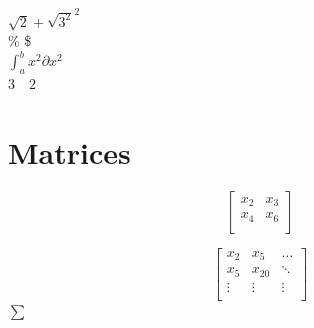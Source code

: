 \documentclass{article}
\begin{document}
$\sqrt{2} + \sqrt{3^2}^2$\\

\%  \$	\\
$\int_{a}^{b} x^2 \partial 
x^2$\\

$3\quad 2$ 

\section*{Matrices}

\[  
\begin{bmatrix}
	x_{2} & x_{3}\\
	x_{4} & x_{6}\\
\end{bmatrix}
	\]

\[	
	\begin{bmatrix}
	x_{2} & x_{5} & \dots\\
	x_{5} & x_{20} & \ddots\\
	\vdots & \vdots& \vdots\\
	\end{bmatrix}
	\]	
$\sum$
\end{document}

